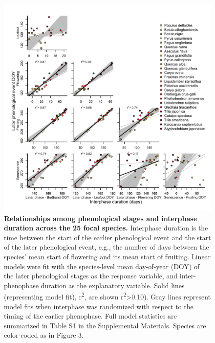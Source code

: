 \documentclass{article}
\begin{document}
\begin{figure}[h]
  \centering
  \includegraphics{../analyses/figures/Hyp2.pdf}
  \caption{\textbf{Relationships among phenological stages and interphase duration across the 25 focal species.} Interphase duration is the time between the start of the earlier phenological event and the start of the later phenological event, e.g., the number of days between the species' mean start of flowering and its mean start of fruiting. Linear models were fit with the species-level mean day-of-year (DOY) of the later phenological stages as the response variable, and inter-phenophase duration as the explanatory variable. Solid lines (representing model fit), r\textsuperscript{2}, are shown r\textsuperscript{2}>0.10). Gray lines represent model fits when interphase was randomized with respect to the timing of the earlier phenophase. Full model statistics are summarized in Table S1 in the Supplemental Materials. Species are color-coded as in Figure 3.}
  \label{fig:inter}
   \end{figure}

\end{document}
